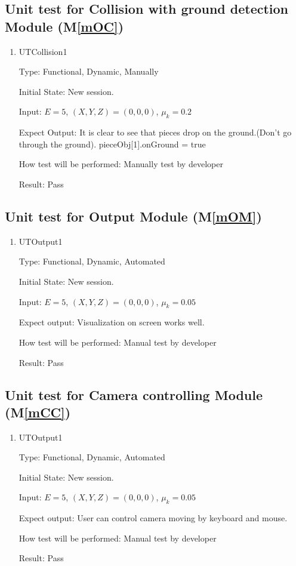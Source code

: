 \documentclass[12pt, titlepage]{article}
\newcommand{\mref}[1]{M\ref{#1}}
\begin{document}
\subsection{Unit test for Collision with ground detection Module (\mref{mOC})}
\label{Sec_UmOC}
\begin{enumerate}
	
	\item{UTCollision1\\}
	
	Type: Functional, Dynamic, Manually
	
	Initial State: New session.
	
	Input: $E = 5$, $(X,Y,Z) = (0,0,0)$, $\mu_{k} = 0.2$
	
	Expect Output: It is clear to see that pieces drop on the ground.(Don't go through the ground). pieceObj[1].onGround = true
	
	How test will be performed: Manually test by developer
	
	Result: Pass
\end{enumerate}

\subsection{Unit test for Output Module (\mref{mOM})}
\label{Sec_UmOM}
\begin{enumerate}
	
	\item{UTOutput1\\}
	
	Type: Functional, Dynamic, Automated
	
	Initial State: New session.
	
	Input: $E = 5$, $(X,Y,Z) = (0,0,0)$, $\mu_{k} = 0.05$
	
	Expect output: Visualization on screen works well.
	
	How test will be performed: Manual test by developer
	
	Result: Pass
\end{enumerate}

\subsection{Unit test for Camera controlling Module (\mref{mCC})}
\label{Sec_UmCC}
\begin{enumerate}
	
	\item{UTOutput1\\}
	
	Type: Functional, Dynamic, Automated
	
	Initial State: New session.
	
	Input: $E = 5$, $(X,Y,Z) = (0,0,0)$, $\mu_{k} = 0.05$
	
	Expect output: User can control camera moving by keyboard and mouse.
	
	How test will be performed: Manual test by developer
	
	Result: Pass
\end{enumerate}
\end{document}
